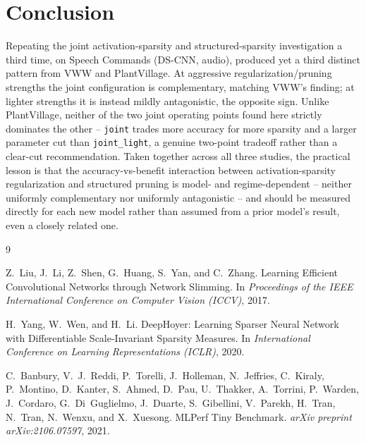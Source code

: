\documentclass[11pt]{article}
\newcommand{\code}[1]{\texttt{#1}}
\begin{document}
\section{Conclusion}

Repeating the joint activation-sparsity and structured-sparsity investigation a third time, on Speech Commands (DS-CNN, audio), produced yet a third distinct pattern from VWW and PlantVillage. At aggressive regularization/pruning strengths the joint configuration is complementary, matching VWW's finding; at lighter strengths it is instead mildly antagonistic, the opposite sign. Unlike PlantVillage, neither of the two joint operating points found here strictly dominates the other -- \code{joint} trades more accuracy for more sparsity and a larger parameter cut than \code{joint\_light}, a genuine two-point tradeoff rather than a clear-cut recommendation. Taken together across all three studies, the practical lesson is that the accuracy-vs-benefit interaction between activation-sparsity regularization and structured pruning is model- and regime-dependent -- neither uniformly complementary nor uniformly antagonistic -- and should be measured directly for each new model rather than assumed from a prior model's result, even a closely related one.

\begin{thebibliography}{9}

Z.~Liu, J.~Li, Z.~Shen, G.~Huang, S.~Yan, and C.~Zhang.
\newblock Learning Efficient Convolutional Networks through Network Slimming.
\newblock In \emph{Proceedings of the IEEE International Conference on Computer Vision (ICCV)}, 2017.

H.~Yang, W.~Wen, and H.~Li.
\newblock DeepHoyer: Learning Sparser Neural Network with Differentiable Scale-Invariant Sparsity Measures.
\newblock In \emph{International Conference on Learning Representations (ICLR)}, 2020.

C.~Banbury, V.~J.~Reddi, P.~Torelli, J.~Holleman, N.~Jeffries, C.~Kiraly, P.~Montino, D.~Kanter, S.~Ahmed, D.~Pau, U.~Thakker, A.~Torrini, P.~Warden, J.~Cordaro, G.~Di~Guglielmo, J.~Duarte, S.~Gibellini, V.~Parekh, H.~Tran, N.~Tran, N.~Wenxu, and X.~Xuesong.
\newblock MLPerf Tiny Benchmark.
\newblock \emph{arXiv preprint arXiv:2106.07597}, 2021.

\end{thebibliography}
\end{document}
